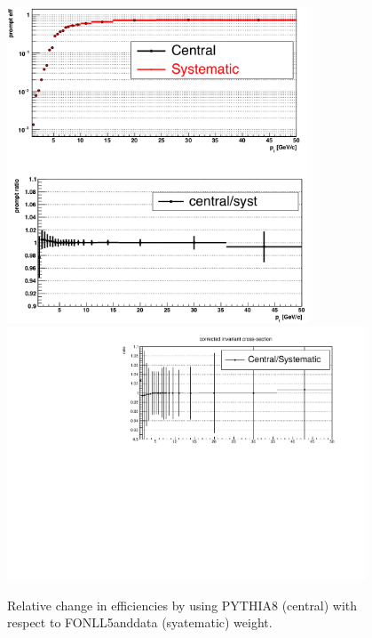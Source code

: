 \begin{figure}[tb]
\begin{center}
 \includegraphics[width=0.8\textwidth]{figures/Dstar/pp13TeV/MCpTShape_syst.png}
 \includegraphics[width=0.95\textwidth]{figures/Dstar/pp13TeV/ratio-cross-section-MC-pT-shpae.pdf}
\caption{Relative change in efficiencies by using PYTHIA8 (central) with respect to FONLL5anddata (syatematic) weight.}
\label{fig:DstarPtWeights010}
\end{center}
\end{figure}




